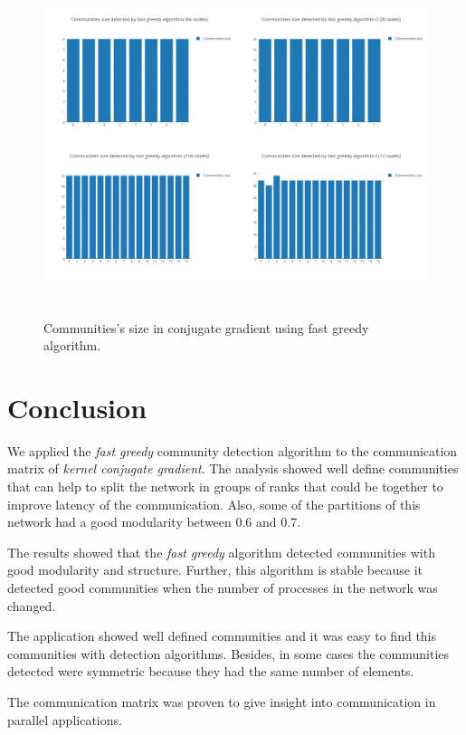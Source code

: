 \documentclass[journal]{IEEEtran}
\begin{document}
\begin{NoHyper}
\begin{figure}[h!]
\includegraphics[width=\textwidth, height=10cm]{number_communities_cg_fg_64_128_256_512}
\caption{Communities's size in conjugate gradient using fast greedy algorithm.}
\label{fig:3}
\end{figure}


\section{Conclusion}

We applied the \textit{fast greedy} community detection algorithm to the communication matrix of \textit{kernel conjugate gradient}. The analysis showed well define communities that can help to split the network in groups of ranks that could be together to improve latency of the communication. Also, some of the partitions of this network had a good modularity between 0.6 and 0.7.

The results showed that the \textit{fast greedy} algorithm detected communities with good modularity and structure. Further, this algorithm is stable because it detected good communities when the number of processes in the network was changed. 

The application showed well defined communities and it was easy to find this communities with detection algorithms. Besides, in some cases the communities detected were symmetric because they had the same number of elements.

The communication matrix was proven to give insight into communication in parallel applications.


\end{NoHyper}
\end{document}
